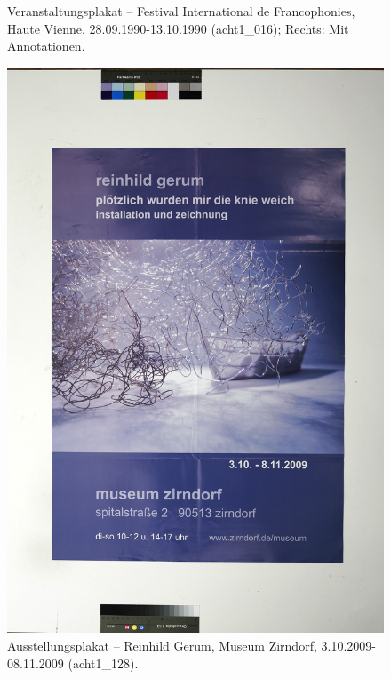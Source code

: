 \documentclass[a4paper,12pt,ngerman]{article}
\begin{document}
\begin{landscape}
\begin{figure}[ht]
\begin{subfigure}[b]{0.5\linewidth}
	\end{subfigure}
	\caption{Veranstaltungsplakat -- Festival International de Francophonies, Haute Vienne, 28.09.1990-13.10.1990 (acht1\_016); Rechts: Mit Annotationen.}
\end{figure}
\end{landscape}

\newpage
\begin{figure}[ht]
\includegraphics[width=\linewidth]{Abbildung_32_(acht1_128)}
\centering
\caption{Ausstellungsplakat -- Reinhild Gerum, Museum Zirndorf, 3.10.2009-08.11.2009 (acht1\_128).}
\end{figure}
\end{document}

